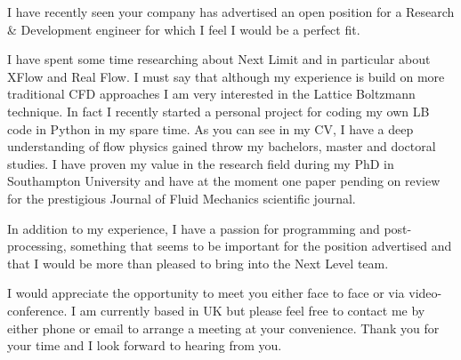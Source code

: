 \documentclass[10pt,stdletter,dateno,sigleft]{newlfm} %
\begin{document}
\begin{newlfm}


I have recently seen your company has advertised an open position for a Research \&
Development engineer for which I feel I would be a perfect fit.

I have spent some time researching about Next Limit and in particular about XFlow
and Real Flow. I must say that although my experience is build on more traditional CFD
approaches I am very interested in the Lattice Boltzmann technique. In fact I recently
started a personal project for coding my own LB code in Python in my spare time. As you can
see in my CV, I have a deep understanding of flow physics gained throw my bachelors,
master and doctoral studies. I have proven my value in the research field during my PhD in
Southampton University and have at the moment one paper pending on review for the
prestigious Journal of Fluid Mechanics scientific journal.

In addition to my experience, I have a passion for programming and post-processing, something
that seems to be important for the position advertised and that I would be more than
pleased to bring into the Next Level team.

I would appreciate the opportunity to meet you either face to face or via
video-conference. I am currently based in UK but please feel free to contact me by
either phone or email to arrange a meeting at your convenience. Thank you for
your time and I look forward to hearing from you.

\end{newlfm}
\end{document}
